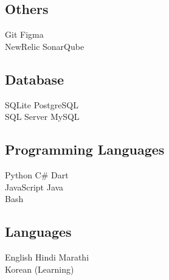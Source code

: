 \documentclass[]{deedy-resume-reversed}
\begin{document}
\begin{minipage}[t]{0.33\textwidth}
\subsection{Others}
Git \textbullet Figma \\
NewRelic \textbullet SonarQube \\
\sectionsep

\subsection{Database}
SQLite \textbullet PostgreSQL \\
SQL Server \textbullet MySQL \\
\sectionsep

\subsection{Programming Languages}
Python \textbullet{} C\# \textbullet{} Dart \\
JavaScript \textbullet{} Java \\
Bash
\sectionsep

\subsection{Languages}
English \textbullet{} Hindi \textbullet{} Marathi \\
Korean (Learning) 
\sectionsep

\end{minipage}
\end{document}
